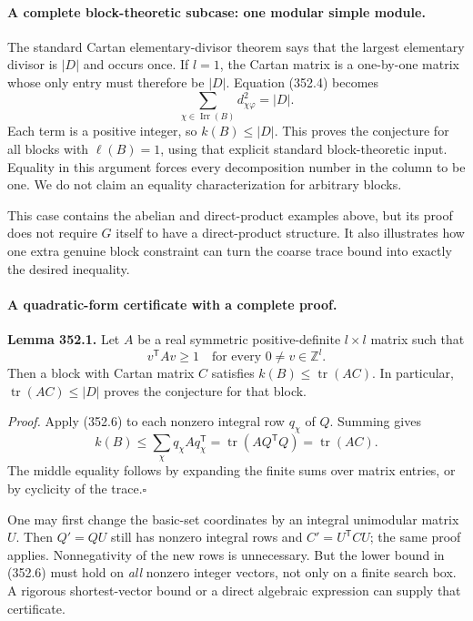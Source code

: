 \documentclass[11pt]{article}
\begin{document}
\paragraph{A complete block-theoretic subcase: one modular simple module.}
The standard Cartan elementary-divisor theorem says that the largest
elementary divisor is $|D|$ and occurs once. If $l=1$, the Cartan
matrix is a one-by-one matrix whose only entry must therefore be $|D|$.
Equation (352.4) becomes
\[
 \sum_{\chi\in\operatorname{Irr}(B)}d_{\chi\varphi}^2=|D|.
\]
Each term is a positive integer, so $k(B)\le|D|$. This proves the
conjecture for all blocks with $\ell(B)=1$, using that explicit
standard block-theoretic input. Equality in this argument forces every
decomposition number in the column to be one. We do not claim an
equality characterization for arbitrary blocks.

This case contains the abelian and direct-product examples above,
but its proof does not require $G$ itself to have a direct-product
structure. It also illustrates how one extra genuine block constraint
can turn the coarse trace bound into exactly the desired inequality.

\paragraph{A quadratic-form certificate with a complete proof.}
\textbf{Lemma 352.1.} Let $A$ be a real symmetric positive-definite
$l\times l$ matrix such that
\[
 v^{\mathsf T}Av\ge1\quad\text{for every }0\ne v\in\mathbb Z^l.
 \tag{352.6}
\]
Then a block with Cartan matrix $C$ satisfies
$k(B)\le\operatorname{tr}(AC)$. In particular,
$\operatorname{tr}(AC)\le|D|$ proves the conjecture for that block.

\emph{Proof.} Apply (352.6) to each nonzero integral row $q_\chi$
of $Q$. Summing gives
\[
 k(B)\le\sum_\chi q_\chi A q_\chi^{\mathsf T}
       =\operatorname{tr}(A Q^{\mathsf T}Q)
       =\operatorname{tr}(AC).
\]
The middle equality follows by expanding the finite sums over matrix
entries, or by cyclicity of the trace.\hfill$\square$

One may first change the basic-set coordinates by an integral unimodular
matrix $U$. Then $Q'=QU$ still has nonzero integral rows and
$C'=U^{\mathsf T}CU$; the same proof applies. Nonnegativity of the
new rows is unnecessary. But the lower bound in (352.6) must hold on
\emph{all} nonzero integer vectors, not only on a finite search box.
A rigorous shortest-vector bound or a direct algebraic expression can
supply that certificate.
\end{document}
